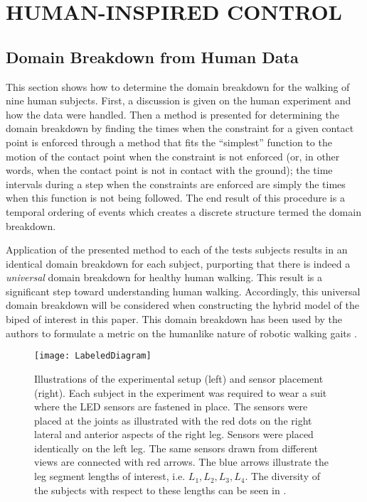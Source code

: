 \chapter{\uppercase{Human-Inspired Control}} \label{ch:hic}

\section{Domain Breakdown from Human Data} \label{sec:domainbreakdown} \noindent
This section shows how to determine the domain breakdown for the walking of nine
human subjects.  First, a discussion is given on the human experiment and how
the data were handled. Then a method is presented for determining the domain
breakdown by finding the times when the constraint for a given contact point is
enforced through a method that fits the ``simplest'' function to the motion of
the contact point when the constraint is not enforced (or, in other words, when
the contact point is not in contact with the ground); the time intervals during
a step when the constraints are enforced are simply the times when this function
is not being followed. The end result of this procedure is a temporal ordering
of events which creates a discrete structure termed the domain breakdown.

Application of the presented method to each of the tests subjects results in an
identical domain breakdown for each subject, purporting that there is indeed a
{\em universal} domain breakdown for healthy human walking. This result is a
significant step toward understanding human walking. Accordingly, this universal
domain breakdown will be considered when constructing the hybrid model of the
biped of interest in this paper. This domain breakdown has been used by the
authors to formulate a metric on the humanlike nature of robotic walking gaits \cite{Ames2011,Vasudevan2013}.

\begin{figure}[t!]
  \centering
  \texttt{[image: LabeledDiagram]}
  \caption[Illustrations of the experimental setup]{Illustrations of the experimental setup (left) and sensor placement (right). Each subject in the experiment was required to wear a suit where the LED sensors are fastened in place. The sensors were placed at the joints as illustrated with the red dots on the right lateral and anterior aspects of the right leg. Sensors were placed identically on the left leg. The same sensors drawn from different views are connected with red arrows. The blue arrows illustrate the leg segment lengths of interest, i.e. $L_1, L_2, L_3, L_4$. The diversity of the subjects with respect to these lengths can be seen in .}
  \label{fig:Sensors}
\end{figure}

